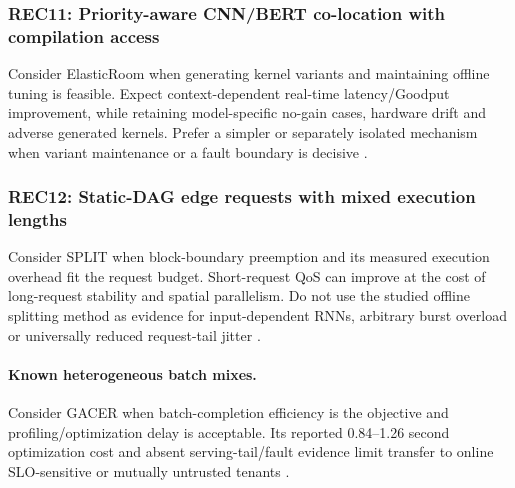 \subsubsection*{REC11: Priority-aware CNN/BERT co-location with compilation access}
Consider ElasticRoom when generating kernel variants and maintaining offline tuning is feasible. Expect context-dependent real-time latency/Goodput improvement, while retaining model-specific no-gain cases, hardware drift and adverse generated kernels. Prefer a simpler or separately isolated mechanism when variant maintenance or a fault boundary is decisive \cite{s028}.
\subsubsection*{REC12: Static-DAG edge requests with mixed execution lengths}
Consider SPLIT when block-boundary preemption and its measured execution overhead fit the request budget. Short-request QoS can improve at the cost of long-request stability and spatial parallelism. Do not use the studied offline splitting method as evidence for input-dependent RNNs, arbitrary burst overload or universally reduced request-tail jitter \cite{s029}.
\paragraph{Known heterogeneous batch mixes.} Consider GACER when batch-completion efficiency is the objective and profiling/optimization delay is acceptable. Its reported 0.84--1.26 second optimization cost and absent serving-tail/fault evidence limit transfer to online SLO-sensitive or mutually untrusted tenants \cite{s027}.
